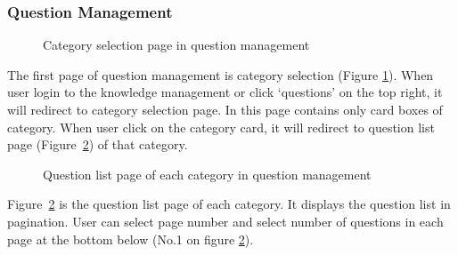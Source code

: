 \documentclass[12pt,oneside,openright,a4paper]{cpe-english-project}
\begin{document}
	\subsubsection{Question Management}
		\begin{figure}[!h]\centering
			\caption{Category selection page in question management}\label{fig:Category_selection_page_in_question_management_done}
		\end{figure}
		\begin{flushleft}
			The first page of question management is category selection (Figure \ref*{fig:Category_selection_page_in_question_management_done}). When user login to the knowledge management or click ‘questions’ on the top right, it will redirect to category selection page. In this page contains only card boxes of category. When user click on the category card, it will redirect to question list page (Figure~\ref*{fig:Question_list_page_of_each_category_in_question_management_done}) of that category.
		\end{flushleft}
\pagebreak
		\begin{figure}[!h]\centering
			\caption{Question list page of each category in question management}\label{fig:Question_list_page_of_each_category_in_question_management_done}
		\end{figure}
		\begin{flushleft}
			Figure~\ref*{fig:Question_list_page_of_each_category_in_question_management_done} is the question list page of each category. It displays the question list in pagination. User can select page number and select number of questions in each page at the bottom below (No.1 on figure \ref*{fig:Question_list_page_of_each_category_in_question_management_done}).
		\end{flushleft}
\end{document}
